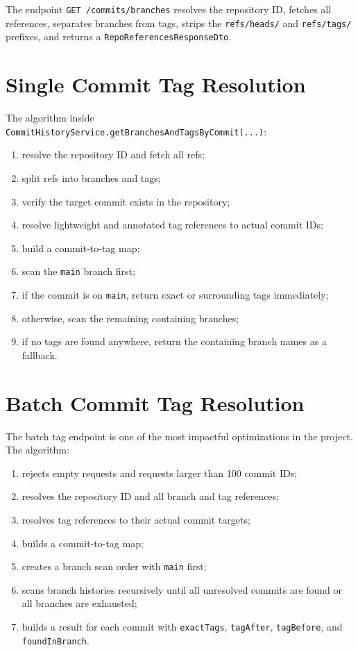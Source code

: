 \documentclass[12pt,a4paper]{report}
\newcommand{\code}[1]{\texttt{\small\color{codered}#1}}
\begin{document}
The endpoint \code{GET /commits/branches} resolves the repository ID, fetches
all references, separates branches from tags, strips the \code{refs/heads/} and
\code{refs/tags/} prefixes, and returns a \code{RepoReferencesResponseDto}.

\section{Single Commit Tag Resolution}

The algorithm inside \code{CommitHistoryService.getBranchesAndTagsByCommit(...)}:

\begin{enumerate}
  \item resolve the repository ID and fetch all refs;
  \item split refs into branches and tags;
  \item verify the target commit exists in the repository;
  \item resolve lightweight and annotated tag references to actual commit IDs;
  \item build a commit-to-tag map;
  \item scan the \code{main} branch first;
  \item if the commit is on \code{main}, return exact or surrounding tags immediately;
  \item otherwise, scan the remaining containing branches;
  \item if no tags are found anywhere, return the containing branch names as a fallback.
\end{enumerate}

\section{Batch Commit Tag Resolution}

The batch tag endpoint is one of the most impactful optimizations in the project.
The algorithm:

\begin{enumerate}
  \item rejects empty requests and requests larger than 100 commit IDs;
  \item resolves the repository ID and all branch and tag references;
  \item resolves tag references to their actual commit targets;
  \item builds a commit-to-tag map;
  \item creates a branch scan order with \code{main} first;
  \item scans branch histories recursively until all unresolved commits are found or all branches are exhausted;
  \item builds a result for each commit with \code{exactTags}, \code{tagAfter}, \code{tagBefore}, and \code{foundInBranch}.
\end{enumerate}
\end{document}
